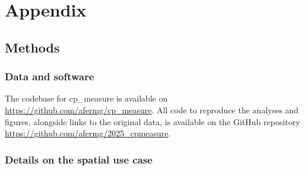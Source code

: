 \documentclass{article}
\date{}
\title{}
\begin{document}
\section{Appendix}

\setcounter{figure}{0}
\renewcommand{\thefigure}{A\arabic{figure}}

\setcounter{section}{5}
\renewcommand{\thesection}{\arabic{section}}
\renewcommand{\thesubsection}{\thesection.\arabic{subsection}}
\renewcommand{\thesubsubsection}{\thesubsection.\arabic{subsubsection}}

\label{sec:orgdd18dd8}
\subsection{Methods}
\label{sec:orgb3e9382}
\subsubsection{Data and software}
\label{sec:orgbda0ae2}
The codebase for cp\_measure is available on \url{https://github.com/afermg/cp_measure}. All code to reproduce the analyses and figures, alongside links to the original data, is available on the GitHub repository \url{https://github.com/afermg/2025_cpmeasure}. 
% 

\subsubsection{Details on the spatial use case}
\label{sec:spatial_extra}
\end{document}
